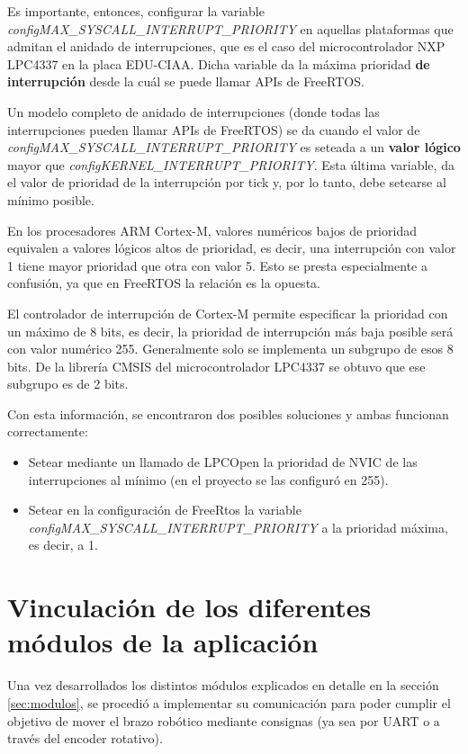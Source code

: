 \documentclass{IEEEtran}
\begin{document}
Es importante, entonces, configurar la variable \textit{configMAX\_SYSCALL\_INTERRUPT\_PRIORITY} en aquellas plataformas que admitan el anidado de interrupciones, que es el caso del microcontrolador NXP LPC4337 en la placa EDU-CIAA. Dicha variable da la máxima prioridad \textbf{de interrupción} desde la cuál se puede llamar APIs de FreeRTOS.

Un modelo completo de anidado de interrupciones (donde todas las interrupciones pueden llamar APIs de FreeRTOS) se da cuando el valor de \textit{configMAX\_SYSCALL\_INTERRUPT\_PRIORITY} es seteada a un \textbf{valor lógico} mayor que \textit{configKERNEL\_INTERRUPT\_PRIORITY}. Esta última variable, da el valor de prioridad de la interrupción por tick y, por lo tanto, debe setearse al mínimo posible.

En los procesadores ARM Cortex-M, valores numéricos bajos de prioridad equivalen a valores lógicos altos de prioridad, es decir, una interrupción con valor 1 tiene mayor prioridad que otra con valor 5. Esto se presta especialmente a confusión, ya que en FreeRTOS la relación es la opuesta.

El controlador de interrupción de Cortex-M permite especificar la prioridad con un máximo de 8 bits, es decir, la prioridad de interrupción más baja posible será con valor numérico 255. Generalmente solo se implementa un subgrupo de esos 8 bits. De la librería CMSIS del microcontrolador LPC4337 se obtuvo que ese subgrupo es de 2 bits.

Con esta información, se encontraron dos posibles soluciones y ambas funcionan correctamente:

\begin{itemize}
    \item Setear mediante un llamado de LPCOpen la prioridad de NVIC de las interrupciones al mínimo (en el proyecto se las configuró en 255).
    \item Setear en la configuración de FreeRtos la variable \textit{configMAX\_SYSCALL\_INTERRUPT\_PRIORITY} a la prioridad máxima, es decir, a 1.
\end{itemize}

\section{Vinculación de los diferentes módulos de la aplicación}
\label{sec:vinculacion}

Una vez desarrollados los distintos módulos explicados en detalle en la sección \ref{sec:modulos}, se procedió a implementar su comunicación para poder cumplir el objetivo de mover el brazo robótico mediante consignas (ya sea por UART o a través del encoder rotativo).
\end{document}
